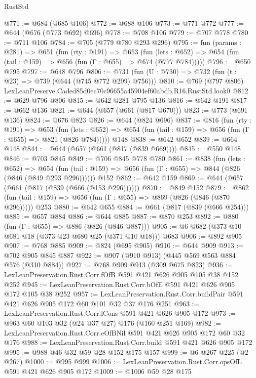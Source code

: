 \begin{lexlean}{RustStd}
\begin{coremodule}
@771 := @684 (@685 @106)
@772 := @688 @106
@773 := @771 @772
@777 := @644 (@676 (@773 @692) @696)
@778 := @708 @106
@779 := @707 @778
@780 := @711 @106
@784 := @705 (@779 @780 @293 @296)
@795 := fun (params : @281) =>
  @651
    (fun (rty : @191) =>
    @653
      (fun (lets : @652) => @654 (fun (tail : @159) => @656 (fun (Γ : @655) => @674 (@777 @784)))))
@796 := @650 @795
@797 := @648 @796
@806 := @731 (fun (U : @730) => @732 (fun (t : @23) => @739 (@644 (@745 @772 @299) @756)))
@810 := @769 (@797 @806) LexLeanPreserve.Caded85d0ec70c96655a45904ef60abdb.R16.RustStd.look0
@812 := @629 @796 @806
@815 := @642 @281 @795 @136
@816 := @642 @191
@817 := @662 @136
@821 := @644 (@657 (@661 (@817 @670)))
@823 := @773 (@691 @136)
@824 := @676 @823
@826 := @644 (@824 @696)
@837 := @816
    (fun (rty : @191) =>
    @653
      (fun (lets : @652) => @654 (fun (tail : @159) => @656 (fun (Γ : @655) => @821 (@826 @784)))))
    @148
@838 := @642 @652
@839 := @664 @148
@844 := @644 (@657 (@661 (@817 (@839 @669))))
@845 := @550 @148
@846 := @703 @845
@849 := @706 @845 @778 @780
@861 := @838
    (fun (lets : @652) =>
    @654 (fun (tail : @159) => @656 (fun (Γ : @655) => @844 (@826 (@846 (@849 @293 @296))))))
    @152
@862 := @642 @159
@869 := @644 (@657 (@661 (@817 (@839 (@666 (@153 @296))))))
@870 := @849 @152
@879 := @862 (fun (tail : @159) => @656 (fun (Γ : @655) => @869 (@826 (@846 (@870 @296))))) @253
@880 := @642 @655
@884 := @661 (@817 (@839 (@666 @254)))
@885 := @657 @884
@886 := @644 @885
@887 := @870 @253
@892 := @880 (fun (Γ : @655) => @886 (@826 (@846 @887)))
@905 := @6 @682 (@373 @10 @681 @18 (@373 @23 @680 @25 (@371 @10 @18))) @683
@906 := @892 @905
@907 := @768 @885
@909 := @824 (@695 @905)
@910 := @644 @909
@913 := @702 @905 @845 @887
@922 := @907 (@910 @913) (@445 @569 @563 @884 @576 (@310 @884))
@927 := @768 @909 @913 (@309 @675 @823)
@936 := LexLeanPreservation.Rust.Corr.fOfB @591 @421 @626 @905 @105 @38 @152 @252
@945 := LexLeanPreservation.Rust.Corr.bOfE @591 @421 @626 @905 @172 @105 @38 @252
@957 := LexLeanPreservation.Rust.Corr.buildPair @591 @421 @626 @905 @172 @60 @101 @32 @37 @176 @251
@963 := LexLeanPreservation.Rust.Corr.lCons @591 @421 @626 @905 @172
@973 := @963 @60 @103 @32 (@24 @37 @27) @176 (@160 @251 @169)
@982 := LexLeanPreservation.Rust.Corr.eOfBNil @591 @421 @626 @905 @172 @60 @32 @176
@988 := LexLeanPreservation.Rust.Corr.build @591 @421 @626 @905 @172
@995 := @988 @46 @32 @59 @28 @152 @175 @157
@999 := @6 @267 @225 (@2 @267)
@1000 := @995 @999
@1006 := LexLeanPreservation.Rust.Corr.opsOfL @591 @421 @626 @905 @172
@1009 := @1006 @59 @28 @175

\end{coremodule}
\end{lexlean}
